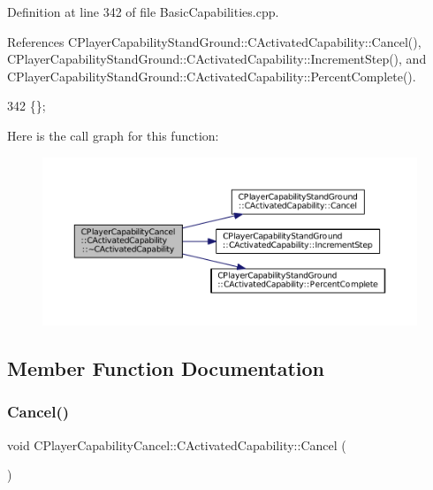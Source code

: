 Definition at line 342 of file Basic\+Capabilities.\+cpp.



References C\+Player\+Capability\+Stand\+Ground\+::\+C\+Activated\+Capability\+::\+Cancel(), C\+Player\+Capability\+Stand\+Ground\+::\+C\+Activated\+Capability\+::\+Increment\+Step(), and C\+Player\+Capability\+Stand\+Ground\+::\+C\+Activated\+Capability\+::\+Percent\+Complete().


\begin{DoxyCode}
342 \{\};
\end{DoxyCode}
Here is the call graph for this function\+:\nopagebreak
\begin{figure}[H]
\begin{center}
\leavevmode
\includegraphics[width=350pt]{classCPlayerCapabilityCancel_1_1CActivatedCapability_ae0d7d8f36d4ac21c04d68dc6ad2ae9c4_cgraph}
\end{center}
\end{figure}


\subsection{Member Function Documentation}
\hypertarget{classCPlayerCapabilityCancel_1_1CActivatedCapability_accd67b449574b6c99e21f522d13bc96a}{}\label{classCPlayerCapabilityCancel_1_1CActivatedCapability_accd67b449574b6c99e21f522d13bc96a} 
\subsubsection{\texorpdfstring{Cancel()}{Cancel()}}
{\footnotesize\ttfamily void C\+Player\+Capability\+Cancel\+::\+C\+Activated\+Capability\+::\+Cancel (\begin{DoxyParamCaption}{ }\end{DoxyParamCaption})\hspace{0.3cm}{\ttfamily [virtual]}}



